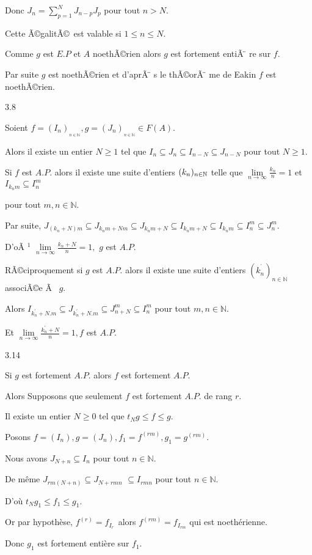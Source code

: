 \documentclass[11pt, twoside]{article}
\begin{document}
Donc $J_{n}=\sum\limits_{p=1}^{N}J_{n-p}J_{p}$ pour tout $n>N.$

Cette \~{A}\copyright galit\~{A}\copyright\ est valable si $1\leq n\leq N.$

Comme $g$ est $E.P$ et $A$ noeth\~{A}\copyright rien alors $g$ est fortement
enti\~{A}%
\"{}%
re sur $f.$

Par suite $g$ est noeth\~{A}\copyright rien et d'apr\~{A}%
\"{}%
s le th\~{A}\copyright or\~{A}%
\"{}%
me de Eakin $f$ est noeth\~{A}\copyright rien.

3.8

Soient $f=(I_{n})_{_{n\in \mathbb{N}}},g=(J_{n})_{_{n\in\mathbb{N}}}\in F(A).
$

Alors il existe un entier $N\geq 1$ tel que $I_{n}\subseteq J_{n}\subseteq
I_{n-N}\subseteq J_{n-N}$ pour tout $N\geq 1.$

Si $f$ est $A.P.$ alors il existe une suite d'entiers $(k_{n})_{n\in \mathbb{%
N}}$ telle que $\underset{n\longrightarrow \infty }{\lim }\frac{k_{n}}{n}=1$
et $I_{k_{n}m}\subseteq I_{n}^{m}$

pour tout $m,n\in \mathbb{N}.$

Par suite, $J_{(k_{n}+N)m}\subseteq J_{k_{n}m+Nm}\subseteq
J_{k_{n}m+N}\subseteq I_{k_{n}m+N}\subseteq I_{k_{n}m}\subseteq
I_{n}^{m}\subseteq J_{n}^{m}.$

D'o\~{A}%
${{}^1}$
$\underset{n\longrightarrow \infty }{\lim }\frac{k_{n}+N}{n}=1,$ $g$ est $%
A.P.$

R\~{A}\copyright ciproquement si $g$ est $A.P.$ alors il existe une suite
d'entiers $(k_{n}^{^{\prime }})_{n\in \mathbb{N}}$ associ\~{A}\copyright e 
\~{A}~ $g.$

Alors $I_{k_{n}^{\prime }+N.m}\subseteq J_{k_{n}^{\prime }+N.m}\subseteq
J_{n+N}^{m}\subseteq I_{n}^{m}$ pour tout $m,n\in \mathbb{N}.$

Et $\underset{n\longrightarrow \infty }{\lim }\frac{k_{n}^{\prime }+N}{n}=1,f
$ est $A.P.$

\bigskip 

3.14

Si $g$ est fortement $A.P.$ alors $f$ est fortement $A.P.$

Alors Supposons que seulement $f$ est fortement $A.P.$ de rang $r.$

Il existe un entier $N\geq 0$ tel que $t_{N}g\leq f\leq g.$

Posons $f=(I_{n}),g=(J_{n}),f_{1}=f^{(rm)},g_{1}=g^{(rm)}.$

Nous avons $J_{N+n}\subseteq I_{n}$ pour tout $n\in \mathbb{N}.$

De même $J_{rm(N+n)}\subseteq J_{N+rmn}$ $\subseteq I_{rmn}$  pour tout $n\in \mathbb{N}.$

D'où $t_{N}g_{1}\leq f_{1}\leq g_{1}.$

Or par hypothèse, $f^{(r)}=f_{I_{r}\text{ }}$alors $f^{(rm)}=f_{I_{rm}}$
qui est noethérienne.

Donc $g_{1}$ est fortement entière sur $f_{1}.$
\end{document}

